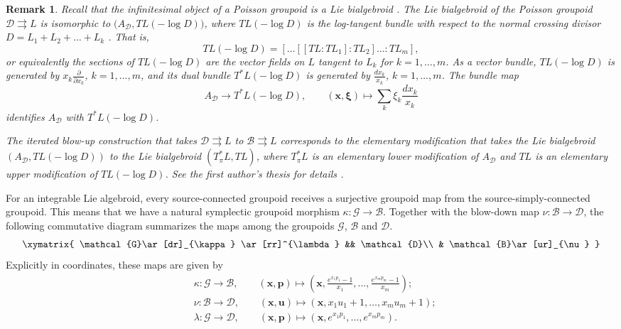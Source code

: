 \documentclass{amsart}
\newtheorem{remark}[theorem]{Remark}
\numberwithin{equation}{section}
\newcommand{\bfp}{{\boldsymbol{p}}}
\newcommand{\bfu}{{\boldsymbol{u}}}
\newcommand{\bfx}{{\boldsymbol{x}}}
\newcommand{\bfxi}{\boldsymbol{\xi}}
\newcommand{\cB}{\mathcal{B}}
\newcommand{\cD}{\mathcal{D}}
\newcommand{\cG}{\mathcal{G}}
\newcommand{\rra}{\rightrightarrows}
\begin{document}
\begin{remark}
  Recall that the infinitesimal object of a Poisson groupoid is a Lie bialgebroid \cite{MX94}.
  The Lie bialgebroid of the Poisson groupoid $\cD \rra L$ is isomorphic to $\big(A_\cD, TL(-\log D)\big)$, where $TL(-\log D)$ is the log-tangent bundle with respect to the normal crossing divisor $D = L_1 + L_2 + \ldots + L_k$ \cite{GL14}.
  That is,
  \[TL(-\log D) = [\ldots[[TL\!:\!TL_1]\!:\!TL_2] \ldots \!:\!TL_m],\]
  or equivalently the sections of $TL(-\log D)$ are the vector fields on $L$ tangent to $L_k$ for $k = 1, \ldots, m$.
  As a vector bundle, $TL(-\log D)$ is generated by $x_k \frac{\partial}{\partial x_k}$, $k = 1, \ldots, m$, and its dual bundle $T^*L(-\log D)$ is generated by $\frac{d x_k}{x_k}$, $k = 1, \ldots, m$.
  The bundle map
  \[A_\cD \to T^*L(-\log D), \qquad (\bfx, \bfxi) \mapsto \sum_k\xi_k\frac{d x_k}{x_k}\]
  identifies $A_\cD$ with $T^*L(-\log D)$.

  The iterated blow-up construction that takes $\cD \rra L$ to $\cB \rra L$ corresponds to the elementary modification that takes the Lie bialgebroid $(A_\cD, TL(-\log D))$ to the Lie bialgebroid $(T^*_\pi L, TL)$, where $T^*_\pi L$ is an elementary lower modification of $A_\cD$ and $TL$ is an elementary upper modification of $TL(-\log D)$.
  See the first author's thesis for details \cite{Li13}.
\end{remark}

For an integrable Lie algebroid, every source-connected groupoid receives a surjective groupoid map from the source-simply-connected groupoid.
This means that we have a natural symplectic groupoid morphism $\kappa:\cG\to\cB$.
Together with the blow-down map $\nu:\cB\to\cD$, the following commutative diagram summarizes the maps among the groupoids $\cG$, $\cB$ and $\cD$.
\begin{equation} 
  \label{eq:LGpdCD}
  \xymatrix{
    \cG  \ar[dr]_{\kappa} \ar[rr]^{\lambda} && \cD \\
      & \cB \ar[ur]_{\nu}
  }
\end{equation}
Explicitly in coordinates, these maps are given by
\begin{align*}
  & \kappa: \cG \to \cB, \qquad (\bfx, \bfp) \mapsto \left(\bfx, \frac{e^{x_1p_1}-1}{x_1}, \ldots, \frac{e^{x_mp_m}-1}{x_m}\right); \\
  & \nu: \cB \to \cD, \qquad (\bfx, \bfu) \mapsto (\bfx, x_1u_1+1, \ldots, x_mu_m+1); \\
  & \lambda: \cG \to \cD, \qquad (\bfx, \bfp) \mapsto (\bfx, e^{x_1p_1}, \ldots, e^{x_mp_m}).
\end{align*}
\end{document}
